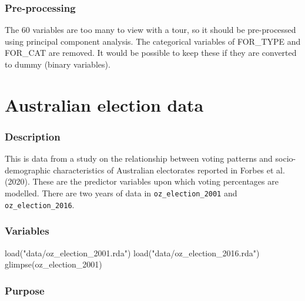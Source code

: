 \documentclass[
  letterpaper,
]{krantz}
\newenvironment{Shaded}{\begin{snugshade}}{\end{snugshade}}
\newcommand{\FunctionTok}[1]{\textcolor[rgb]{0.28,0.35,0.67}{#1}}
\newcommand{\NormalTok}[1]{\textcolor[rgb]{0.00,0.23,0.31}{#1}}
\newcommand{\StringTok}[1]{\textcolor[rgb]{0.13,0.47,0.30}{#1}}
\begin{document}
\subsubsection*{Pre-processing}\label{pre-processing-1}

The 60 variables are too many to view with a tour, so it should be
pre-processed using principal component analysis. The categorical
variables of FOR\_TYPE and FOR\_CAT are removed. It would be possible to
keep these if they are converted to dummy (binary variables).

\section{Australian election data}\label{australian-election-data}

\subsubsection*{Description}\label{description-2}

This is data from a study on the relationship between voting patterns
and socio-demographic characteristics of Australian electorates reported
in Forbes et al. (2020). These are the predictor variables upon which
voting percentages are modelled. There are two years of data in
\texttt{oz\_election\_2001} and \texttt{oz\_election\_2016}.

\subsubsection*{Variables}\label{variables-2}

\begin{Shaded}
\begin{Highlighting}[]
\FunctionTok{load}\NormalTok{(}\StringTok{"data/oz\_election\_2001.rda"}\NormalTok{)}
\FunctionTok{load}\NormalTok{(}\StringTok{"data/oz\_election\_2016.rda"}\NormalTok{)}
\FunctionTok{glimpse}\NormalTok{(oz\_election\_2001)}
\end{Highlighting}
\end{Shaded}

\subsubsection*{Purpose}\label{purpose-2}
\end{document}
